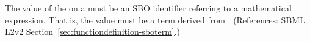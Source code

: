 The value of the   on a \FunctionDefinition must be an
SBO identifier referring to a mathematical expression.  That is, the value
must be a term derived from \sbomathformula.  (References: SBML L2v2
Section~\ref{sec:functiondefinition-sboterm}.)
